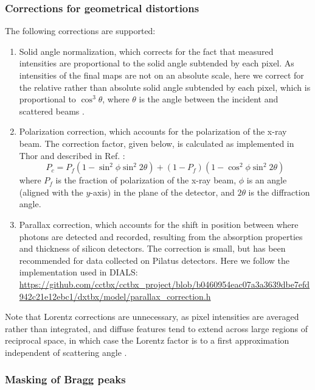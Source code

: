 \documentclass{article}
\begin{document}
\subsubsection{Corrections for geometrical distortions}
The following corrections are supported:
\begin{enumerate}
%
\item Solid angle normalization, which corrects for the fact that measured intensities are proportional to the solid angle subtended by each pixel. As intensities of the final maps are not on an absolute scale, here we correct for the relative rather than absolute solid angle subtended by each pixel, which is proportional to $\cos^3{\theta}$, where $\theta$ is the angle between the incident and scattered beams \cite{wall2009}.
%
\item Polarization correction, which accounts for the polarization of the x-ray beam. The correction factor, given below, is calculated as implemented in Thor \cite{thor} and described in Ref. \cite{hura2000}:
\begin{equation}
P_c = P_f ( 1 - \sin^2{\phi} \sin^2{2\theta} ) + (1-P_f) ( 1 - \cos^2{\phi} \sin^2{2\theta} )
\end{equation}
where $P_f$ is the fraction of polarization of the x-ray beam, $\phi$ is an angle (aligned with the $y$-axis) in the plane of the detector, and $2\theta$ is the diffraction angle.
%
\item Parallax correction, which accounts for the shift in position between where photons are detected and recorded, resulting from the absorption properties and thickness of silicon detectors. The correction is small, but has been recommended for data collected on Pilatus detectors. Here we follow the implementation used in DIALS: \url{https://github.com/cctbx/cctbx_project/blob/b0460954eac07a3a3639dbe7efd942c21e12ebc1/dxtbx/model/parallax_correction.h}
%
\end{enumerate}
%
Note that Lorentz corrections are unnecessary, as pixel intensities are averaged rather than integrated, and diffuse features tend to extend across large regions of reciprocal space, in which case the Lorentz factor is to a first approximation independent of scattering angle \cite{boysen1987}.

\subsubsection{Masking of Bragg peaks}
\end{document}
